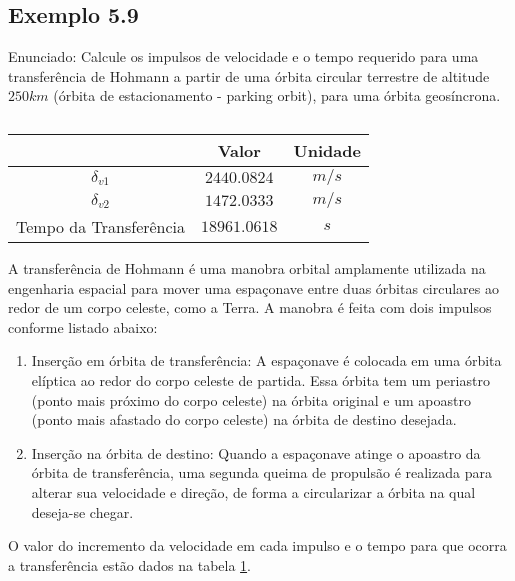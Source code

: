 \subsection{Exemplo 5.9}

Enunciado: Calcule os impulsos de velocidade e o tempo requerido para uma transferência de Hohmann a partir de uma órbita circular terrestre de altitude $250 km$ (órbita de estacionamento - parking orbit), para uma órbita geosíncrona.

\begin{table}[h]
\centering
\caption{}
\label{tab: ex5.9}
\begin{tabular}{|c|c|c|}
\hline
                       & Valor      & Unidade \\ \hline
$\delta_{v1}$                 & $2440.0824$  & $m/s $    \\ \hline
$\delta_{v2}$                 & $1472.0333$  & $m/s$     \\ \hline
Tempo da Transferência & $18961.0618$ & $s$       \\ \hline
\end{tabular}
\end{table}


A transferência de Hohmann é uma manobra orbital amplamente utilizada na engenharia espacial para mover uma espaçonave entre duas órbitas circulares ao redor de um corpo celeste, como a Terra. A manobra é feita com dois impulsos conforme listado abaixo:

\begin{enumerate}

    \item Inserção em órbita de transferência: A espaçonave é colocada em uma órbita elíptica ao redor do corpo celeste de partida. Essa órbita tem um periastro (ponto mais próximo do corpo celeste) na órbita original e um apoastro (ponto mais afastado do corpo celeste) na órbita de destino desejada.

    \item Inserção na órbita de destino: Quando a espaçonave atinge o apoastro da órbita de transferência, uma segunda queima de propulsão é realizada para alterar sua velocidade e direção, de forma a circularizar a órbita na qual deseja-se chegar.

\end{enumerate}

O valor do incremento da velocidade em cada impulso e o tempo para que ocorra a transferência estão dados na tabela \ref{tab: ex5.9}.